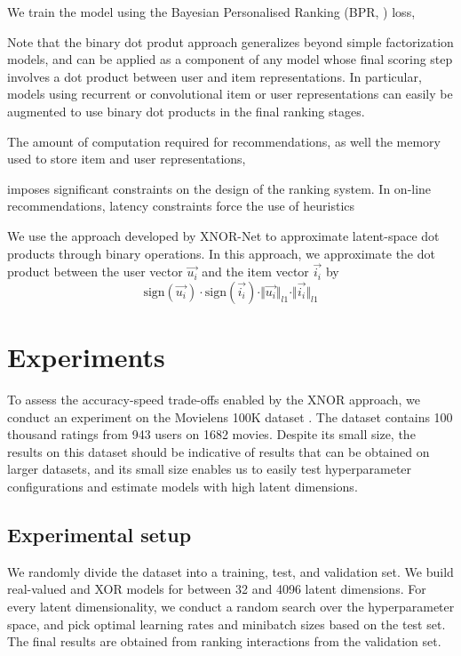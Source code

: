 \documentclass[sigconf]{acmart}
\begin{document}

We train the model using the Bayesian Personalised Ranking (BPR, \cite{rendle2009bpr}) loss,


Note that the binary dot produt approach generalizes beyond simple factorization models, and can be applied as a component of any model whose final scoring step involves a dot product between user and item representations. In particular, models using recurrent \citep{hidasi2015session} or convolutional \citep{lynch2015images} item or user representations can easily be augmented to use binary dot products in the final ranking stages.


The amount of computation required for recommendations, as well the memory used to store item and user representations, 

 imposes significant constraints on the design of the ranking system. In on-line recommendations, latency constraints force the use of heuristics 


We use the approach developed by XNOR-Net to approximate latent-space dot products through binary operations. In this approach, we approximate the dot product between the user vector $\vec{u_i}$ and the item vector $\vec{i_i}$ by
\begin{equation}
\mathrm{sign}(\vec{u_i}) \cdot \mathrm{sign}(\vec{i_i}) \cdot \Vert\vec{u_i}\Vert_{l1} \cdot \Vert\vec{i_i}\Vert_{l1}
\end{equation}



\section{Experiments}
To assess the accuracy-speed trade-offs enabled by the XNOR approach, we conduct an experiment on the Movielens 100K dataset \citep{harper2016movielens}. The dataset contains 100 thousand ratings from 943 users on 1682 movies. Despite its small size, the results on this dataset should be indicative of results that can be obtained on larger datasets, and its small size enables us to easily test hyperparameter configurations and estimate models with high latent dimensions.

\subsection{Experimental setup}
We randomly divide the dataset into a training, test, and validation set. We build real-valued and XOR models for between 32 and 4096 latent dimensions. For every latent dimensionality, we conduct a random search over the hyperparameter space, and pick optimal learning rates and minibatch sizes based on the test set. The final results are obtained from ranking interactions from the validation set.
\end{document}
